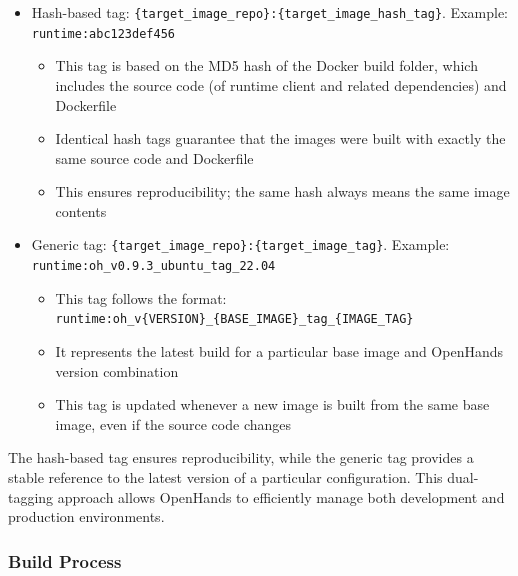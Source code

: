 \begin{itemize}[noitemsep,topsep=0pt,parsep=2pt,partopsep=0pt,leftmargin=18pt]
\item[(1)] Hash-based tag: \texttt{\{target\_image\_repo\}:\{target\_image\_hash\_tag\}}.
   Example: \texttt{runtime:abc123def456}
    \begin{itemize}
        \item This tag is based on the MD5 hash of the Docker build folder, which includes the source code (of runtime client and related dependencies) and Dockerfile
        \item Identical hash tags guarantee that the images were built with exactly the same source code and Dockerfile
        \item This ensures reproducibility; the same hash always means the same image contents
    \end{itemize}

\item[(2)] Generic tag: \texttt{\{target\_image\_repo\}:\{target\_image\_tag\}}.
   Example: \texttt{runtime:oh\_v0.9.3\_ubuntu\_tag\_22.04}

   \begin{itemize}
       \item This tag follows the format: \texttt{runtime:oh\_v\{VERSION\}\_\{BASE\_IMAGE\}\_tag\_\{IMAGE\_TAG\}}
       \item It represents the latest build for a particular base image and OpenHands version combination
       \item This tag is updated whenever a new image is built from the same base image, even if the source code changes
   \end{itemize}
\end{itemize}

The hash-based tag ensures reproducibility, while the generic tag provides a stable reference to the latest version of a particular configuration. This dual-tagging approach allows OpenHands to efficiently manage both development and production environments.

\subsubsection{Build Process}

